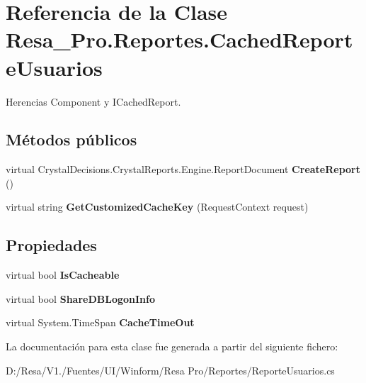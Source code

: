 \section{Referencia de la Clase Resa\+\_\+\+Pro.\+Reportes.\+Cached\+Reporte\+Usuarios}
\label{class_resa___pro_1_1_reportes_1_1_cached_reporte_usuarios}


Herencias Component y I\+Cached\+Report.

\subsection*{Métodos públicos}
\begin{DoxyCompactItemize}
\item 
virtual Crystal\+Decisions.\+Crystal\+Reports.\+Engine.\+Report\+Document {\bfseries Create\+Report} ()\label{class_resa___pro_1_1_reportes_1_1_cached_reporte_usuarios_ab6d11bdaf88864feb025896915b82f8d}

\item 
virtual string {\bfseries Get\+Customized\+Cache\+Key} (Request\+Context request)\label{class_resa___pro_1_1_reportes_1_1_cached_reporte_usuarios_a4eee6bb197c9031fe426894116bc34f5}

\end{DoxyCompactItemize}
\subsection*{Propiedades}
\begin{DoxyCompactItemize}
\item 
virtual bool {\bfseries Is\+Cacheable}\hspace{0.3cm}{\ttfamily  [get, set]}\label{class_resa___pro_1_1_reportes_1_1_cached_reporte_usuarios_a89c2172c8924aa9b11203dd95e4fce83}

\item 
virtual bool {\bfseries Share\+D\+B\+Logon\+Info}\hspace{0.3cm}{\ttfamily  [get, set]}\label{class_resa___pro_1_1_reportes_1_1_cached_reporte_usuarios_a292d6b264f320e63ed46a4aec568cac3}

\item 
virtual System.\+Time\+Span {\bfseries Cache\+Time\+Out}\hspace{0.3cm}{\ttfamily  [get, set]}\label{class_resa___pro_1_1_reportes_1_1_cached_reporte_usuarios_a1f9bf9fdebe27330d327ae7a2e6cc639}

\end{DoxyCompactItemize}


La documentación para esta clase fue generada a partir del siguiente fichero\+:\begin{DoxyCompactItemize}
\item 
D\+:/\+Resa/\+V1./\+Fuentes/\+U\+I/\+Winform/\+Resa Pro/\+Reportes/Reporte\+Usuarios.\+cs\end{DoxyCompactItemize}
